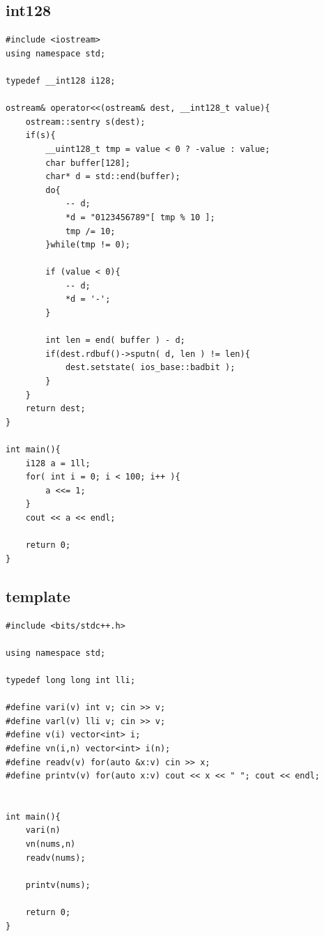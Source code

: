 \documentclass[twoside]{article}
\begin{document}
\begin{multicols*}{2}
\subsectionfont{\large\bfseries\sffamily\underline}
\subsection*{int128}
\begin{verbatim}
#include <iostream>
using namespace std;

typedef __int128 i128;

ostream& operator<<(ostream& dest, __int128_t value){
    ostream::sentry s(dest);
    if(s){
        __uint128_t tmp = value < 0 ? -value : value;
        char buffer[128];
        char* d = std::end(buffer);
        do{
            -- d;
            *d = "0123456789"[ tmp % 10 ];
            tmp /= 10;
        }while(tmp != 0);

        if (value < 0){
            -- d;
            *d = '-';
        }

        int len = end( buffer ) - d;
        if(dest.rdbuf()->sputn( d, len ) != len){
            dest.setstate( ios_base::badbit );
        }
    }
    return dest;
}

int main(){
	i128 a = 1ll;
	for( int i = 0; i < 100; i++ ){
		a <<= 1;
	}
	cout << a << endl;

	return 0;
}
\end{verbatim}

\subsectionfont{\large\bfseries\sffamily\underline}
\subsection*{template}
\begin{verbatim}
#include <bits/stdc++.h>

using namespace std;

typedef long long int lli;

#define vari(v) int v; cin >> v;
#define varl(v) lli v; cin >> v;
#define v(i) vector<int> i;
#define vn(i,n) vector<int> i(n);
#define readv(v) for(auto &x:v) cin >> x;
#define printv(v) for(auto x:v) cout << x << " "; cout << endl;


int main(){
	vari(n)
	vn(nums,n)
	readv(nums);

	printv(nums);

	return 0;
}

\end{verbatim}

\sectionfont{\bfseries\sffamily\centering\Huge}
\vspace{1em}

\end{multicols*}
\end{document}
